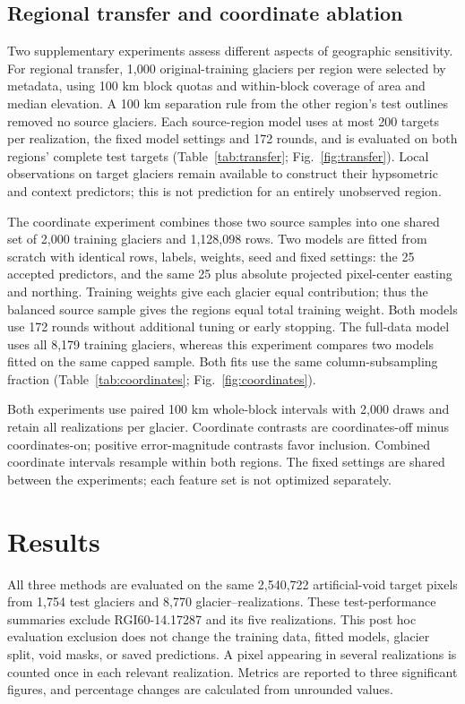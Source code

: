 \documentclass[tc,manuscript]{copernicus}
\begin{document}
\subsection{Regional transfer and coordinate ablation}\label{sec:sensitivities}
Two supplementary experiments assess different aspects of geographic sensitivity. For regional transfer, 1,000 original-training glaciers per region were selected by metadata, using 100 km block quotas and within-block coverage of area and median elevation. A 100 km separation rule from the other region's test outlines removed no source glaciers. Each source-region model uses at most 200 targets per realization, the fixed model settings and 172 rounds, and is evaluated on both regions' complete test targets (Table~\ref{tab:transfer}; Fig.~\ref{fig:transfer}). Local observations on target glaciers remain available to construct their hypsometric and context predictors; this is not prediction for an entirely unobserved region.

The coordinate experiment combines those two source samples into one shared set of 2,000 training glaciers and 1,128,098 rows. Two models are fitted from scratch with identical rows, labels, weights, seed and fixed settings: the 25 accepted predictors, and the same 25 plus absolute projected pixel-center easting and northing. Training weights give each glacier equal contribution; thus the balanced source sample gives the regions equal total training weight. Both models use 172 rounds without additional tuning or early stopping. The full-data model uses all 8,179 training glaciers, whereas this experiment compares two models fitted on the same capped sample. Both fits use the same column-subsampling fraction (Table~\ref{tab:coordinates}; Fig.~\ref{fig:coordinates}).

Both experiments use paired 100 km whole-block intervals with 2,000 draws and retain all realizations per glacier. Coordinate contrasts are coordinates-off minus coordinates-on; positive error-magnitude contrasts favor inclusion. Combined coordinate intervals resample within both regions. The fixed settings are shared between the experiments; each feature set is not optimized separately.


\section{Results}

All three methods are evaluated on the same 2,540,722 artificial-void target pixels from 1,754 test glaciers and 8,770 glacier--realizations. These test-performance summaries exclude RGI60-14.17287 and its five realizations. This post hoc evaluation exclusion does not change the training data, fitted models, glacier split, void masks, or saved predictions. A pixel appearing in several realizations is counted once in each relevant realization. Metrics are reported to three significant figures, and percentage changes are calculated from unrounded values.
\end{document}
